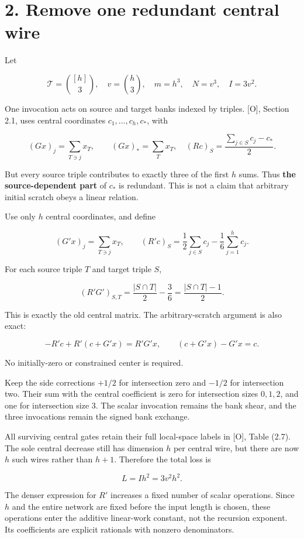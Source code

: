 \documentclass[
  11pt,
  letterpaper,
]{article}
\begin{document}
\section{2. Remove one redundant central
wire}\label{remove-one-redundant-central-wire}

Let

\[
\mathcal T=\binom{[h]}3,\quad v=\binom h3,\quad m=h^3,\quad N=v^3,\quad I=3v^2.
\]

One invocation acts on source and target banks indexed by triples.
{[}O{]}, Section 2.1, uses central coordinates \(c_1,\ldots,c_h,c_*\),
with

\[
(Gx)_j=\sum_{T\ni j}x_T,\qquad (Gx)_*=\sum_Tx_T,
\quad (Rc)_S=\frac{\sum_{j\in S}c_j-c_*}{2}.
\]

But every source triple contributes to exactly three of the first \(h\)
sums. Thus \textbf{the source-dependent part} of \(c_*\) is redundant.
This is not a claim that arbitrary initial scratch obeys a linear
relation.

Use only \(h\) central coordinates, and define

\[
(G'x)_j=\sum_{T\ni j}x_T,
\qquad
(R'c)_S=\frac12\sum_{j\in S}c_j-\frac16\sum_{j=1}^h c_j.
\]

For each source triple \(T\) and target triple \(S\),

\[
(R'G')_{S,T}=\frac{|S\cap T|}{2}-\frac36
=\frac{|S\cap T|-1}{2}.
\]

This is exactly the old central matrix. The arbitrary-scratch argument
is also exact:

\[
-R'c+R'(c+G'x)=R'G'x,
\qquad(c+G'x)-G'x=c.
\]

No initially-zero or constrained center is required.

Keep the side corrections \(+1/2\) for intersection zero and \(-1/2\)
for intersection two. Their sum with the central coefficient is zero for
intersection sizes \(0,1,2\), and one for intersection size \(3\). The
scalar invocation remains the bank shear, and the three invocations
remain the signed bank exchange.

All surviving central gates retain their full local-space labels in
{[}O{]}, Table (2.7). The sole central decrease still has dimension
\(h\) per central wire, but there are now \(h\) such wires rather than
\(h+1\). Therefore the total loss is

\[
\boxed{L=Ih^2=3v^2h^2.}
\]

The denser expression for \(R'\) increases a fixed number of scalar
operations. Since \(h\) and the entire network are fixed before the
input length is chosen, these operations enter the additive linear-work
constant, not the recursion exponent. Its coefficients are explicit
rationals with nonzero denominators.
\end{document}
